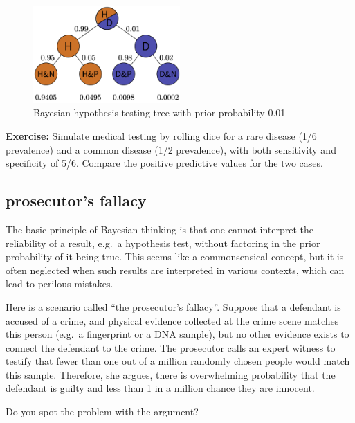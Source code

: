 \documentclass[
  letterpaper,
  DIV=11,
  numbers=noendperiod]{scrreprt}
\begin{document}
\begin{figure}

{\centering \includegraphics[width=0.5\textwidth,height=\textheight]{./images/prob_tree_tikz2.png}

}

\caption{Bayesian hypothesis testing tree with prior probability 0.01}

\end{figure}

\textbf{Exercise:} Simulate medical testing by rolling dice for a rare
disease (1/6 prevalence) and a common disease (1/2 prevalence), with
both sensitivity and specificity of 5/6. Compare the positive predictive
values for the two cases.

\hypertarget{prosecutors-fallacy}{%
\subsection{prosecutor's fallacy}\label{prosecutors-fallacy}}

The basic principle of Bayesian thinking is that one cannot interpret
the reliability of a result, e.g.~a hypothesis test, without factoring
in the prior probability of it being true. This seems like a
commonsensical concept, but it is often neglected when such results are
interpreted in various contexts, which can lead to perilous mistakes.

Here is a scenario called ``the prosecutor's fallacy''. Suppose that a
defendant is accused of a crime, and physical evidence collected at the
crime scene matches this person (e.g.~a fingerprint or a DNA sample),
but no other evidence exists to connect the defendant to the crime. The
prosecutor calls an expert witness to testify that fewer than one out of
a million randomly chosen people would match this sample. Therefore, she
argues, there is overwhelming probability that the defendant is guilty
and less than 1 in a million chance they are innocent.

Do you spot the problem with the argument?
\end{document}
